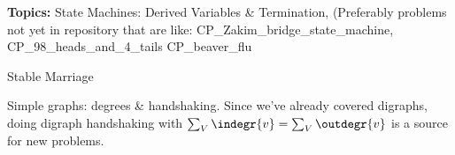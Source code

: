 \documentclass[handout]{mcs}
\begin{document}
\renewcommand{\reading}{Ch.~\bref{derived_var_subsec}, Derived
  Variables; Ch.~\bref{stablemarriagesec}, Stable Marriage;
  Ch.~\bref{degreessec}, Graph Isomorphism}


\begin{staffnotes}
\textbf{Topics:}
State Machines: Derived Variables \& Termination,
(Preferably problems not yet in repository that are like:
{CP\_Zakim\_bridge\_state\_machine},
{CP\_98\_heads\_and\_4\_tails}
{CP\_beaver\_flu}

Stable Marriage

Simple graphs: degrees \& handshaking.  Since we've already covered digraphs, doing digraph handshaking with $\sum_V \indegr{v} = \sum_V
\outdegr{v}$ is a source for new problems.

\end{staffnotes}













\end{document}
